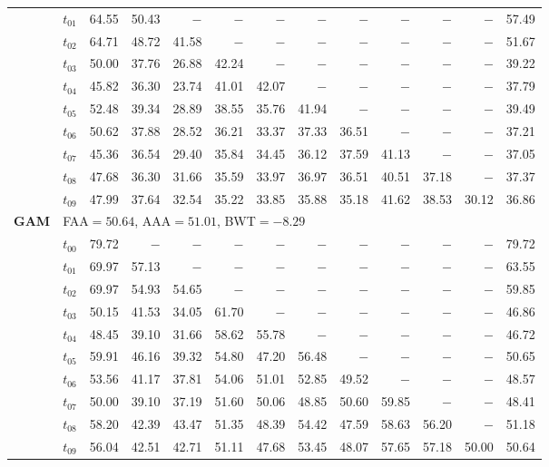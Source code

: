 \begin{table}[ht]
\begin{tabular}{@{}l l r r r r r r r r r r r@{}}
 & $t_{01}$ & 64.55 & 50.43 & $-$ & $-$ & $-$ & $-$ & $-$ & $-$ & $-$ & $-$ & 57.49 \\
 & $t_{02}$ & 64.71 & 48.72 & 41.58 & $-$ & $-$ & $-$ & $-$ & $-$ & $-$ & $-$ & 51.67 \\
 & $t_{03}$ & 50.00 & 37.76 & 26.88 & 42.24 & $-$ & $-$ & $-$ & $-$ & $-$ & $-$ & 39.22 \\
 & $t_{04}$ & 45.82 & 36.30 & 23.74 & 41.01 & 42.07 & $-$ & $-$ & $-$ & $-$ & $-$ & 37.79 \\
 & $t_{05}$ & 52.48 & 39.34 & 28.89 & 38.55 & 35.76 & 41.94 & $-$ & $-$ & $-$ & $-$ & 39.49 \\
 & $t_{06}$ & 50.62 & 37.88 & 28.52 & 36.21 & 33.37 & 37.33 & 36.51 & $-$ & $-$ & $-$ & 37.21 \\
 & $t_{07}$ & 45.36 & 36.54 & 29.40 & 35.84 & 34.45 & 36.12 & 37.59 & 41.13 & $-$ & $-$ & 37.05 \\
 & $t_{08}$ & 47.68 & 36.30 & 31.66 & 35.59 & 33.97 & 36.97 & 36.51 & 40.51 & 37.18 & $-$ & 37.37 \\
 & $t_{09}$ & 47.99 & 37.64 & 32.54 & 35.22 & 33.85 & 35.88 & 35.18 & 41.62 & 38.53 & 30.12 & 36.86 \\
\midrule
\multirow{11}{*}{\textbf{GAM}} & \multicolumn{12}{l}{\quad\small FAA$=50.64$,\; AAA$=51.01$,\; BWT$=-8.29$} \\
 & $t_{00}$ & 79.72 & $-$ & $-$ & $-$ & $-$ & $-$ & $-$ & $-$ & $-$ & $-$ & 79.72 \\
 & $t_{01}$ & 69.97 & 57.13 & $-$ & $-$ & $-$ & $-$ & $-$ & $-$ & $-$ & $-$ & 63.55 \\
 & $t_{02}$ & 69.97 & 54.93 & 54.65 & $-$ & $-$ & $-$ & $-$ & $-$ & $-$ & $-$ & 59.85 \\
 & $t_{03}$ & 50.15 & 41.53 & 34.05 & 61.70 & $-$ & $-$ & $-$ & $-$ & $-$ & $-$ & 46.86 \\
 & $t_{04}$ & 48.45 & 39.10 & 31.66 & 58.62 & 55.78 & $-$ & $-$ & $-$ & $-$ & $-$ & 46.72 \\
 & $t_{05}$ & 59.91 & 46.16 & 39.32 & 54.80 & 47.20 & 56.48 & $-$ & $-$ & $-$ & $-$ & 50.65 \\
 & $t_{06}$ & 53.56 & 41.17 & 37.81 & 54.06 & 51.01 & 52.85 & 49.52 & $-$ & $-$ & $-$ & 48.57 \\
 & $t_{07}$ & 50.00 & 39.10 & 37.19 & 51.60 & 50.06 & 48.85 & 50.60 & 59.85 & $-$ & $-$ & 48.41 \\
 & $t_{08}$ & 58.20 & 42.39 & 43.47 & 51.35 & 48.39 & 54.42 & 47.59 & 58.63 & 56.20 & $-$ & 51.18 \\
 & $t_{09}$ & 56.04 & 42.51 & 42.71 & 51.11 & 47.68 & 53.45 & 48.07 & 57.65 & 57.18 & 50.00 & 50.64 \\

\end{tabular}
\end{table}
